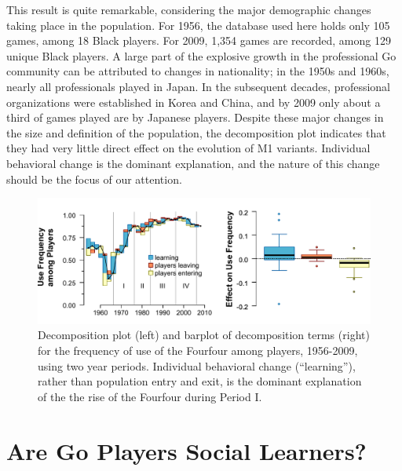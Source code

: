 This result is quite remarkable, considering the major demographic changes taking place in the population.  For 1956, the database used here holds only 105 games, among 18 Black players.  For 2009, 1,354 games are recorded, among 129 unique Black players.  A large part of the explosive growth in the professional Go community can be attributed to changes in nationality; in the 1950s and 1960s, nearly all professionals played in Japan.  In the subsequent decades, professional organizations were established in Korea and China, and by 2009 only about a third of games played are by Japanese players.  Despite these major changes in the size and definition of the population, the decomposition plot indicates that they had very little direct effect on the evolution of M1 variants.  Individual behavioral change is the dominant explanation, and the nature of this change should be the focus of our attention.  


\begin{figure}[t]
\begin{center} 
\includegraphics[scale=0.8]{figures/gofirstmove/figPlayerDecomp.pdf}
\caption{Decomposition plot (left) and barplot of decomposition terms (right) for the frequency of use of the Fourfour among players, 1956-2009, using two year periods.  Individual behavioral change (``learning''), rather than population entry and exit, is the dominant explanation of the the rise of the Fourfour during Period I.}
\label{fig:PlayerDecomp}
\end{center}
\end{figure}




\section{Are Go Players Social Learners?}

